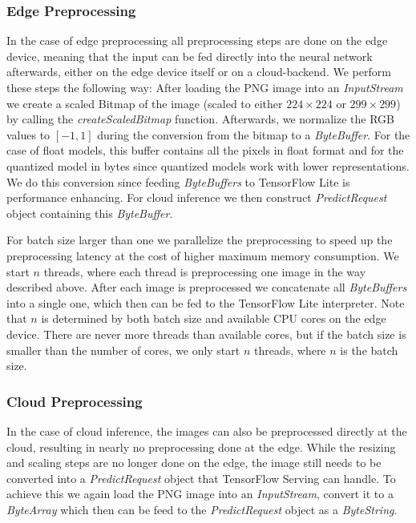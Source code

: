 \subsubsection{Edge Preprocessing}
\label{chap:preproImpl}
In the case of edge preprocessing all preprocessing steps are done on the edge device, meaning that the input can be fed directly into the neural network afterwards, either on the edge device itself or on a cloud-backend.
We perform these steps the following way: After loading the PNG image into an \emph{InputStream} we create a scaled Bitmap of the image (scaled to either $224\times224$ or $299\times299$) by calling the \emph{createScaledBitmap} function. 
Afterwards, we normalize the RGB values to $[-1,1]$ during the conversion from the bitmap to a \emph{ByteBuffer}. 
For the case of float models, this buffer contains all the pixels in float format and for the quantized model in bytes since quantized models work with lower representations.
We do this conversion since feeding \emph{ByteBuffers} to TensorFlow Lite is performance enhancing. %
For cloud inference we then construct \emph{PredictRequest} object containing this \emph{ByteBuffer}.

For batch size larger than one we parallelize the preprocessing to speed up the preprocessing latency at the cost of higher maximum memory consumption. We start $n$ threads, where each thread is preprocessing one image in the way described above. After each image is preprocessed we concatenate all \emph{ByteBuffers} into a single one, which then can be fed to the TensorFlow Lite interpreter. Note that $n$ is determined by both batch size and available CPU cores on the edge device. There are never more threads than available cores, but if the batch size is smaller than the number of cores, we only start $n$ threads, where $n$ is the batch size. 

\subsubsection{Cloud Preprocessing}

In the case of cloud inference, the images can also be preprocessed directly at the cloud, resulting in nearly no preprocessing done at the edge. While the resizing and scaling steps are no longer done on the edge, the image still needs to be converted into a \emph{PredictRequest} object that TensorFlow Serving can handle.
To achieve this we again load the PNG image into an \emph{InputStream}, convert it to a \emph{ByteArray} which then can be feed to the \emph{PredictRequest} object as a \emph{ByteString}. 

